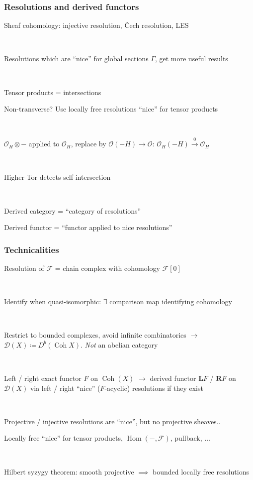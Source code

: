 \documentclass{beamer}
\DeclareMathOperator{\Hom}{Hom}
\DeclareMathOperator{\Coh}{Coh}
\renewcommand{\O}{\mathcal{O}}
\newcommand{\calD}{\mathcal{D}}
\newcommand{\calF}{\mathcal{F}}
\newcommand{\dL}{\mathbf{L}}
\newcommand{\dR}{\mathbf{R}}
\begin{document}
\begin{frame}
    \frametitle{Resolutions and derived functors}

    Sheaf cohomology: injective resolution, \v{C}ech resolution, LES

    ~

    Resolutions which are ``nice'' for global sections $\Gamma$, get more useful
    results \pause

    ~

    Tensor products = intersections

    Non-transverse? Use locally free resolutions ``nice'' for tensor products \pause

    ~

    $\O_H\otimes-$ applied to $\O_H$, replace by $\O(-H)\to\O$:
    $\O_H(-H)\xrightarrow{0}\O_H$

    ~

    Higher Tor detects self-intersection \pause

    ~

    Derived category = ``category of resolutions''

    Derived functor = ``functor applied to nice resolutions''
\end{frame}

\begin{frame}
    \frametitle{Technicalities}

    Resolution of $\calF$ = chain complex with cohomology $\calF[0]$

    ~

    Identify when quasi-isomorphic: $\exists$ comparison map identifying
    cohomology

    ~

    Restrict to bounded complexes, avoid infinite combinatorics $\to$
    $\calD(X)\coloneqq D^b(\Coh X)$. \pause \emph{Not} an abelian category \pause

    ~

    Left / right exact functor $F$ on $\Coh(X)$ $\to$ derived functor $\dL F$ /
    $\dR F$ on $\calD(X)$ via left / right ``nice'' ($F$-acyclic) resolutions if
    they exist

    ~

    Projective / injective resolutions are ``nice'', but no projective sheaves..

    Locally free ``nice'' for tensor products, $\Hom(-,\calF)$, pullback, $\ldots$

    ~

    Hilbert syzygy theorem: smooth projective $\implies$ bounded locally free
    resolutions
\end{frame}
\end{document}
